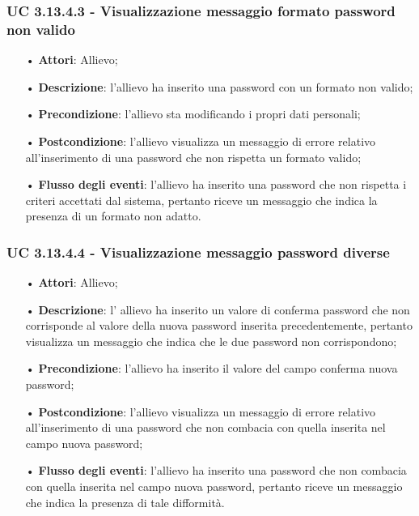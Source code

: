 \subsubsection{UC 3.13.4.3 - Visualizzazione messaggio formato password non valido}
\begin{itemize}
	\item[•]\textbf{Attori}: Allievo;
	\item[•]\textbf{Descrizione}: l'allievo ha inserito una password con un formato non valido;
	\item[•]\textbf{Precondizione}: l'allievo sta modificando i propri dati personali;
	\item[•]\textbf{Postcondizione}: l'allievo visualizza un messaggio di errore relativo all'inserimento di una password che non rispetta un formato valido; 
	\item[•]\textbf{Flusso degli eventi}: l'allievo ha inserito una password che non rispetta i criteri accettati dal sistema, pertanto riceve un messaggio che indica la presenza di un formato non adatto.
\end{itemize}

\subsubsection{UC 3.13.4.4 - Visualizzazione messaggio password diverse}
\begin{itemize}
	\item[•]\textbf{Attori}: Allievo;
	\item[•]\textbf{Descrizione}: l' allievo ha inserito un valore di conferma password che non corrisponde al valore della nuova password inserita precedentemente, pertanto visualizza un messaggio che indica che le due password non corrispondono;
	\item[•]\textbf{Precondizione}: l'allievo ha inserito il valore del campo conferma nuova password;
	\item[•]\textbf{Postcondizione}: l'allievo visualizza un messaggio di errore relativo all'inserimento di una password che non combacia con quella inserita nel campo nuova password; 
	\item[•]\textbf{Flusso degli eventi}: l'allievo ha inserito una password che non combacia con quella inserita nel campo nuova password, pertanto riceve un messaggio che indica la presenza di tale difformità.
\end{itemize}

